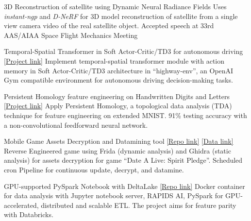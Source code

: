 \vspace{-5mm}
\vspace{-2mm}

\begin{cventries}


	\cventry
	{}
	{3D Reconstruction of satellite using Dynamic Neural Radiance Fields}
	{}
	{}
	{Uses \emph{instant-ngp} and \emph{D-NeRF} for 3D model reconstruction of satellite from a single view camera video of the real satellite object. \newline Accepted speech at 33rd AAS/AIAA Space Flight Mechanics Meeting}

	\cventry
	{}
	{Temporal-Spatial Transformer in Soft Actor-Critic/TD3 for autonomous driving}
	{\href{https://github.com/sesem738/Lavenza}{[Project link]}}
	{}
	{Implement temporal-spatial transformer module with action memory in Soft Actor-Critic/TD3 architecture in ``highway-env'', an OpenAI Gym compatible environment for autonomous driving decision-making tasks.}

	\cventry
	{}
	{Persistent Homology feature engineering on Handwritten Digits and Letters}
	{\href{https://colab.research.google.com/drive/18z161k3diYO6sNVBfiKH8uGqbrekxMPN?usp=sharing}{[Project link]}}
	{}
	{Apply Persistent Homology, a topological data analysis (TDA) technique for feature engineering on extended MNIST. 91\% testing accuracy with a non-convolutional feedforward neural network.}

	\cventry
	{}
	{Mobile Game Assets Decryption and Datamining tool}
	{\href{https://github.com/n0k0m3/DALSP-Assets-Decryption-tool}{[Repo link]} \href{https://github.com/n0k0m3/DateALiveData}{[Data link]}}
	{}
	{Reverse Engineered game using Frida (dynamic analysis) and Ghidra (static analysis) for assets decryption for game ``Date A Live: Spirit Pledge''. Scheduled cron Pipeline for continuous update, decrypt, and datamine.}

	\cventry
	{}
	{GPU-supported PySpark Notebook with DeltaLake}
	{\href{https://github.com/n0k0m3/pyspark-notebook-deltalake-docker}{[Repo link]}}
	{}
	{Docker container for data analysis with Jupyter notebook server, RAPIDS AI, PySpark for GPU-accelerated, distributed and scalable ETL. The project aims for feature parity with Databricks.}


\end{cventries}